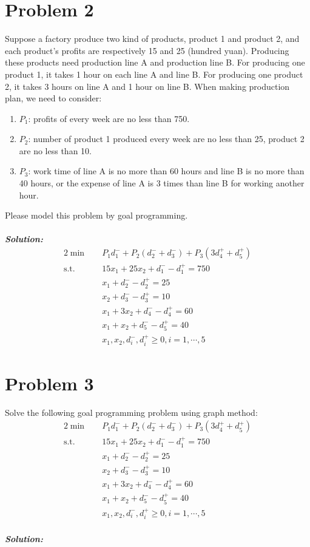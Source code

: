 \documentclass[paper=a4, fontsize=11pt]{scrartcl} %
\numberwithin{equation}{section} %
\numberwithin{figure}{section} %
\numberwithin{table}{section} %
\begin{document}
\section{Problem 2}
Suppose a factory produce two kind of products, product 1 and product 2, and each product's profits are respectively 15 and 25 (hundred yuan). Producing these products need production line A and production line B. For producing one product 1, it takes 1 hour on each line A and line B. For producing one product 2, it takes 3 hours on line A and 1 hour on line B. When making production plan, we need to consider:
\begin{enumerate}
\item $P_1$: profits of every week are no less than 750.
\item $P_2$: number of product 1 produced every week are no less than 25, product 2 are no less than 10.
\item $P_3$: work time of line A is no more than 60 hours and line B is no more than 40 hours, or the expense of line A is 3 times than line B for working another hour.
\end{enumerate}
Please model this problem by goal programming.\\\\
\emph{\textbf{Solution:}}\\
\begin{alignat}{2}          \nonumber
\min\quad & P_1d_1^-+P_2(d_2^-+d_3^-)+P_3(3d_4^++d_5^+) \\    \nonumber
\mbox{s.t.}\quad            \nonumber
& 15x_1+25x_2+d_1^--d_1^+ = 750\\        \nonumber
& x_1+d_2^--d_2^+ = 25\\                \nonumber
& x_2+d_3^--d_3^+ = 10\\              \nonumber
& x_1+3x_2+d_4^--d_4^+ = 60\\            \nonumber
& x_1+x_2+d_5^--d_5^+ = 40\\             \nonumber
& x_1,x_2,d_i^-,d_i^+ \geq 0, i=1,\cdots,5
\end{alignat}

\section{Problem 3}
Solve the following goal programming problem using graph method:
\begin{alignat}{2}          \nonumber
\min\quad & P_1d_1^-+P_2(d_2^-+d_3^-)+P_3(3d_4^++d_5^+) \\    \nonumber
\mbox{s.t.}\quad            \nonumber
& 15x_1+25x_2+d_1^--d_1^+ = 750\\        \nonumber
& x_1+d_2^--d_2^+ = 25\\                \nonumber
& x_2+d_3^--d_3^+ = 10\\              \nonumber
& x_1+3x_2+d_4^--d_4^+ = 60\\            \nonumber
& x_1+x_2+d_5^--d_5^+ = 40\\             \nonumber
& x_1,x_2,d_i^-,d_i^+ \geq 0, i=1,\cdots,5
\end{alignat}\\
\emph{\textbf{Solution:}}\\
\end{document}
